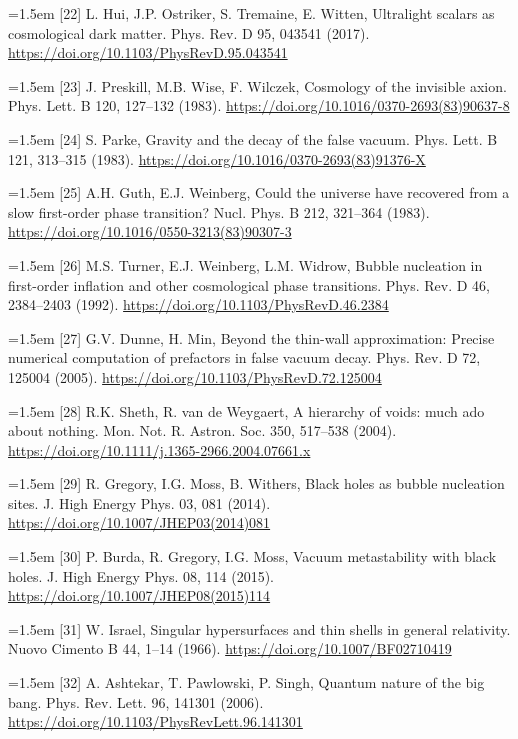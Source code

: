 \documentclass[preprint,12pt]{elsarticle}
\begin{document}
\noindent\hangindent=1.5em [22] L. Hui, J.P. Ostriker, S. Tremaine, E. Witten, Ultralight scalars as cosmological dark matter. Phys. Rev. D 95, 043541 (2017). \url{https://doi.org/10.1103/PhysRevD.95.043541}\par
\noindent\hangindent=1.5em [23] J. Preskill, M.B. Wise, F. Wilczek, Cosmology of the invisible axion. Phys. Lett. B 120, 127--132 (1983). \url{https://doi.org/10.1016/0370-2693(83)90637-8}\par
\noindent\hangindent=1.5em [24] S. Parke, Gravity and the decay of the false vacuum. Phys. Lett. B 121, 313--315 (1983). \url{https://doi.org/10.1016/0370-2693(83)91376-X}\par
\noindent\hangindent=1.5em [25] A.H. Guth, E.J. Weinberg, Could the universe have recovered from a slow first-order phase transition? Nucl. Phys. B 212, 321--364 (1983). \url{https://doi.org/10.1016/0550-3213(83)90307-3}\par
\noindent\hangindent=1.5em [26] M.S. Turner, E.J. Weinberg, L.M. Widrow, Bubble nucleation in first-order inflation and other cosmological phase transitions. Phys. Rev. D 46, 2384--2403 (1992). \url{https://doi.org/10.1103/PhysRevD.46.2384}\par
\noindent\hangindent=1.5em [27] G.V. Dunne, H. Min, Beyond the thin-wall approximation: Precise numerical computation of prefactors in false vacuum decay. Phys. Rev. D 72, 125004 (2005). \url{https://doi.org/10.1103/PhysRevD.72.125004}\par
\noindent\hangindent=1.5em [28] R.K. Sheth, R. van de Weygaert, A hierarchy of voids: much ado about nothing. Mon. Not. R. Astron. Soc. 350, 517--538 (2004). \url{https://doi.org/10.1111/j.1365-2966.2004.07661.x}\par
\noindent\hangindent=1.5em [29] R. Gregory, I.G. Moss, B. Withers, Black holes as bubble nucleation sites. J. High Energy Phys. 03, 081 (2014). \url{https://doi.org/10.1007/JHEP03(2014)081}\par
\noindent\hangindent=1.5em [30] P. Burda, R. Gregory, I.G. Moss, Vacuum metastability with black holes. J. High Energy Phys. 08, 114 (2015). \url{https://doi.org/10.1007/JHEP08(2015)114}\par
\noindent\hangindent=1.5em [31] W. Israel, Singular hypersurfaces and thin shells in general relativity. Nuovo Cimento B 44, 1--14 (1966). \url{https://doi.org/10.1007/BF02710419}\par
\noindent\hangindent=1.5em [32] A. Ashtekar, T. Pawlowski, P. Singh, Quantum nature of the big bang. Phys. Rev. Lett. 96, 141301 (2006). \url{https://doi.org/10.1103/PhysRevLett.96.141301}\par
\end{document}
